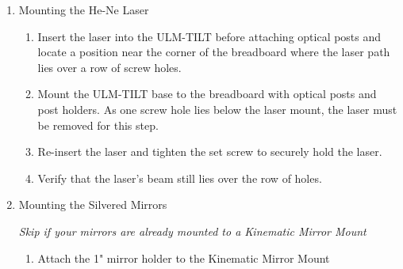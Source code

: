     \begin{enumerate}
    \item Mounting the He-Ne Laser
        \begin{enumerate}
        \item Insert the laser into the ULM-TILT before attaching optical
        posts and locate a position near the corner of the breadboard where the
        laser path lies over a row of screw holes.
        \item Mount the ULM-TILT base to the breadboard with optical posts and
        post holders. As one screw hole lies below the laser mount, the laser
        must be removed for this step.
        \item Re-insert the laser and tighten the set screw to securely hold the
        laser.
        \item Verify that the laser's beam still lies over the row of holes.
        \end{enumerate}
    \item Mounting the Silvered Mirrors

        \emph{Skip if your mirrors are already mounted to a Kinematic Mirror
        Mount}


        \begin{enumerate}
        \item Attach the 1" mirror holder to the Kinematic Mirror Mount


\end{enumerate}
\end{enumerate}
